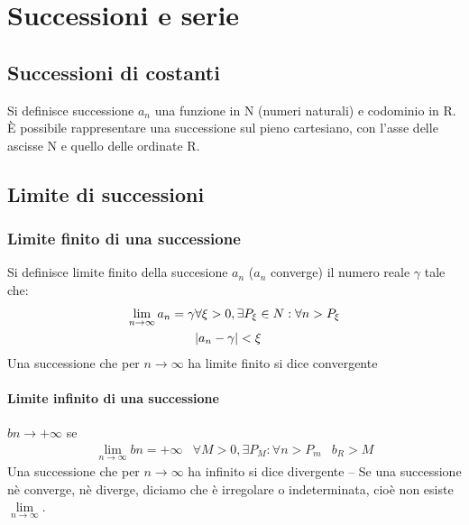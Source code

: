\chapter{Successioni e serie}
\section{Successioni di costanti}
\begin{defi}
  Si definisce successione $a_n$ una funzione in N (numeri naturali) e codominio in R.\\
  È possibile rappresentare una successione sul pieno cartesiano, con l'asse delle
  ascisse N e quello delle ordinate R.
\end{defi}

\section{Limite di successioni}
\subsection{Limite finito di una successione}
\begin{defi}
  Si definisce limite finito della succesione $a_n$ ($a_n$ converge) il numero reale
  $\gamma$ tale che:
  \begin{eqnarray*}
    \lim_{n\to \infty} a_n=\gamma & \forall \xi >0, \exists P_\xi \in N:\forall n > P_\xi\\
                                  & \lvert a_n-\gamma\rvert < \xi
  \end{eqnarray*}
  Una successione che per $n\to \infty$ ha limite finito si dice {\color{red}convergente}
\end{defi}
\subsubsection{Limite infinito di una successione}
$bn\to +\infty$ se
\begin{eqnarray*}
  \lim_{n\to\infty}bn=+\infty & \forall M>0, \exists P_M:\forall n > P_m & b_R>M
\end{eqnarray*}
Una successione che per $n\to \infty$ ha infinito si dice {\color{red}divergente} --
Se una successione nè converge, nè diverge, diciamo che è {\color{red}irregolare} o
{\color{red}indeterminata}, cioè non esiste $\lim\limits_{n\to\infty}$.

